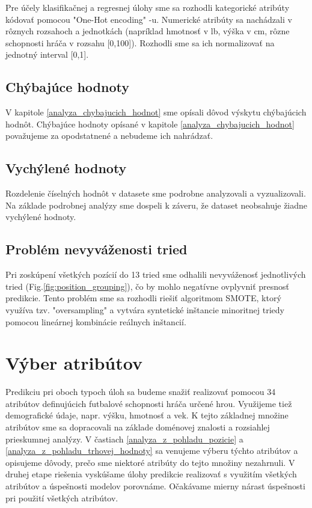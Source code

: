 \documentclass[runningheads]{llncs}
\begin{document}
Pre účely klasifikačnej a regresnej úlohy sme sa rozhodli kategorické atribúty kódovať pomocou "One-Hot encoding" -u. Numerické atribúty sa nachádzali v rôznych rozsahoch a jednotkách (napríklad hmotnosť v lb, výška v cm, rôzne schopnosti hráča v rozsahu [0,100]). Rozhodli sme sa ich normalizovať na jednotný interval [0,1].

\subsection {Chýbajúce hodnoty}
V kapitole \ref{analyza_chybajucich_hodnot} sme opísali dôvod výskytu chýbajúcich hodnôt. Chýbajúce hodnoty opísané v kapitole \ref{analyza_chybajucich_hodnot} považujeme za opodstatnené a nebudeme ich nahrádzať.

\subsection {Vychýlené hodnoty}
Rozdelenie číselných hodnôt v datasete sme podrobne analyzovali a vyzualizovali. Na základe podrobnej analýzy sme dospeli k záveru, že dataset neobsahuje žiadne vychýlené hodnoty.

\subsection {Problém nevyváženosti tried}
Pri zoskúpení všetkých pozícií do 13 tried sme odhalili nevyváženosť jednotlivých tried (Fig.\ref{fig:position_grouping}), čo by mohlo negatívne ovplyvniť presnosť predikcie. Tento problém sme sa rozhodli riešiť algoritmom SMOTE, ktorý využíva tzv. "oversampling" a vytvára syntetické inštancie minoritnej triedy pomocou lineárnej kombinácie reálnych inštancií.\cite{AlbertoFernandez2018}

\section{Výber atribútov}
Predikciu pri oboch typoch úloh sa budeme snažiť realizovať pomocou 34 atribútov definujúcich futbalové schopnosti hráča určené hrou. Využijeme tiež demografické údaje, napr. výšku, hmotnosť a vek. K tejto základnej množine atribútov sme sa dopracovali na základe doménovej znalosti a rozsiahlej prieskumnej analýzy. V častiach \ref{analyza_z_pohladu_pozicie} a \ref{analyza_z_pohladu_trhovej_hodnoty} sa venujeme výberu týchto atribútov a opisujeme dôvody, prečo sme niektoré atribúty do tejto množiny nezahrnuli.
V druhej etape riešenia vyskúšame úlohy predikcie realizovať s využitím všetkých atribútov a úspešnosti modelov porovnáme. Očakávame mierny nárast úspešnosti pri použití všetkých atribútov.
\end{document}
